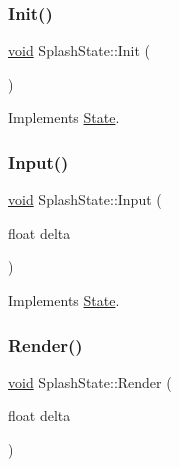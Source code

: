 \subsubsection{\texorpdfstring{Init()}{Init()}}
{\footnotesize\ttfamily \hyperlink{imgui__impl__opengl3__loader_8h_ac668e7cffd9e2e9cfee428b9b2f34fa7}{void} Splash\+State\+::\+Init (\begin{DoxyParamCaption}{ }\end{DoxyParamCaption})\hspace{0.3cm}{\ttfamily [virtual]}}



Implements \hyperlink{classState_a7ab4d8c6aa239a17ed579d89a209b156}{State}.

\mbox{\label{classSplashState_adb2eb87bd89e41af0c3a9d0903e89450}} 
\subsubsection{\texorpdfstring{Input()}{Input()}}
{\footnotesize\ttfamily \hyperlink{imgui__impl__opengl3__loader_8h_ac668e7cffd9e2e9cfee428b9b2f34fa7}{void} Splash\+State\+::\+Input (\begin{DoxyParamCaption}\item[{float}]{delta }\end{DoxyParamCaption})\hspace{0.3cm}{\ttfamily [virtual]}}



Implements \hyperlink{classState_a1705412877f37a5cc8fc712542756076}{State}.

\mbox{\label{classSplashState_a5efb6f0ede61ec76ee2dd72a6b24c57c}} 
\subsubsection{\texorpdfstring{Render()}{Render()}}
{\footnotesize\ttfamily \hyperlink{imgui__impl__opengl3__loader_8h_ac668e7cffd9e2e9cfee428b9b2f34fa7}{void} Splash\+State\+::\+Render (\begin{DoxyParamCaption}\item[{float}]{delta }\end{DoxyParamCaption})\hspace{0.3cm}{\ttfamily [virtual]}}



